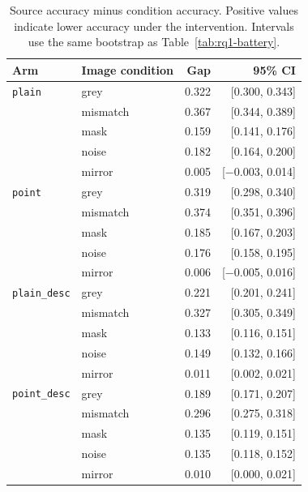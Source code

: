 \begin{table}[ht]
\centering
\caption[Stage~1 gaps relative to source]{Source accuracy minus condition
accuracy. Positive values indicate lower accuracy under the intervention.
Intervals use the same bootstrap as Table~\ref{tab:rq1-battery}.}
\label{tab:rq1-gaps}
\begin{tabular}{llrr}
\toprule
Arm & Image condition & Gap & 95\% CI \\
\midrule
\texttt{plain} & grey & 0.322 & [0.300, 0.343] \\
 & mismatch & 0.367 & [0.344, 0.389] \\
 & mask & 0.159 & [0.141, 0.176] \\
 & noise & 0.182 & [0.164, 0.200] \\
 & mirror & 0.005 & [$-$0.003, 0.014] \\
\texttt{point} & grey & 0.319 & [0.298, 0.340] \\
 & mismatch & 0.374 & [0.351, 0.396] \\
 & mask & 0.185 & [0.167, 0.203] \\
 & noise & 0.176 & [0.158, 0.195] \\
 & mirror & 0.006 & [$-$0.005, 0.016] \\
\texttt{plain\_desc} & grey & 0.221 & [0.201, 0.241] \\
 & mismatch & 0.327 & [0.305, 0.349] \\
 & mask & 0.133 & [0.116, 0.151] \\
 & noise & 0.149 & [0.132, 0.166] \\
 & mirror & 0.011 & [0.002, 0.021] \\
\texttt{point\_desc} & grey & 0.189 & [0.171, 0.207] \\
 & mismatch & 0.296 & [0.275, 0.318] \\
 & mask & 0.135 & [0.119, 0.151] \\
 & noise & 0.135 & [0.118, 0.152] \\
 & mirror & 0.010 & [0.000, 0.021] \\
\bottomrule
\end{tabular}
\end{table}
